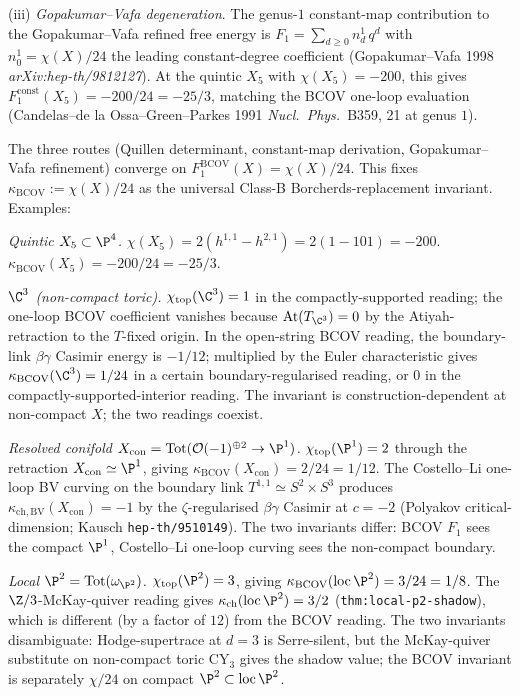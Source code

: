 (iii) \emph{Gopakumar--Vafa degeneration}. The genus-$1$
constant-map contribution to the Gopakumar--Vafa refined free
energy is $F_1 = \sum_{d \geq 0} n^1_d\, q^d$ with $n^1_0 =
\chi(X)/24$ the leading constant-degree coefficient
(Gopakumar--Vafa 1998 \emph{arXiv:hep-th/9812127}). At the
quintic $X_5$ with $\chi(X_5) = -200$, this gives
$F_1^{\mathrm{const}}(X_5) = -200/24 = -25/3$, matching the
BCOV one-loop evaluation (Candelas--de la Ossa--Green--Parkes
1991 \emph{Nucl.\ Phys.}~B359, 21 at genus $1$).

The three routes (Quillen determinant, constant-map derivation,
Gopakumar--Vafa refinement) converge on $F_1^{\mathrm{BCOV}}(X) =
\chi(X)/24$. This fixes $\kappa_{\mathrm{BCOV}} := \chi(X)/24$ as
the universal Class-B Borcherds-replacement invariant. Examples:

\emph{Quintic $X_5 \subset \P^4$.} $\chi(X_5) = 2(h^{1, 1} -
h^{2, 1}) = 2(1 - 101) = -200$. $\kappa_{\mathrm{BCOV}}(X_5) =
-200/24 = -25/3$.

\emph{$\C^3$ (non-compact toric).} $\chi_{\mathrm{top}}(\C^3) =
1$ in the compactly-supported reading; the one-loop BCOV
coefficient vanishes because $\mathrm{At}(T_{\C^3}) = 0$ by the
Atiyah-retraction to the $T$-fixed origin. In the open-string
BCOV \cite{Costello-Li 1606.00365} reading, the boundary-link
$\beta\gamma$ Casimir energy is $-1/12$; multiplied by the
Euler characteristic gives $\kappa_{\mathrm{BCOV}}(\C^3) = 1/24$
in a certain boundary-regularised reading, or $0$ in the
compactly-supported-interior reading. The invariant is
construction-dependent at non-compact $X$; the two readings
coexist.

\emph{Resolved conifold $X_{\mathrm{con}} = \mathrm{Tot}(\mathcal{O}
(-1)^{\oplus 2} \to \P^1)$.} $\chi_{\mathrm{top}}(\P^1) = 2$
through the retraction $X_{\mathrm{con}} \simeq \P^1$, giving
$\kappa_{\mathrm{BCOV}}(X_{\mathrm{con}}) = 2/24 = 1/12$. The
Costello--Li one-loop BV curving on the boundary link
$T^{1, 1} \simeq S^2 \times S^3$ produces
$\kappa_{\mathrm{ch, BV}}(X_{\mathrm{con}}) = -1$ by the
$\zeta$-regularised $\beta\gamma$ Casimir at $c = -2$
(Polyakov critical-dimension; Kausch \texttt{hep-th/9510149}). The
two invariants differ: BCOV $F_1$ sees the compact $\P^1$,
Costello--Li one-loop curving sees the non-compact boundary.

\emph{Local $\P^2 = \mathrm{Tot}(\omega_{\P^2})$.}
$\chi_{\mathrm{top}}(\P^2) = 3$, giving
$\kappa_{\mathrm{BCOV}}(\mathrm{loc}\,\P^2) = 3/24 = 1/8$. The
$\Z/3$-McKay-quiver reading gives
$\kappa_{\mathrm{ch}}(\mathrm{loc}\,\P^2) = 3/2$
(\texttt{thm:local-p2-shadow}), which is different (by a factor
of $12$) from the BCOV reading. The two invariants
disambiguate: Hodge-supertrace at $d = 3$ is Serre-silent, but the
McKay-quiver substitute on non-compact toric CY$_3$ gives the
shadow value; the BCOV invariant is separately
$\chi/24$ on compact $\P^2 \subset \mathrm{loc}\,\P^2$.

